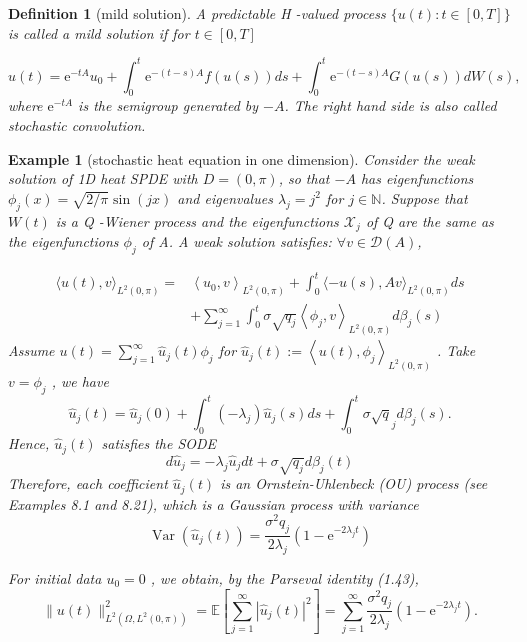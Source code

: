\documentclass{article}
\newtheorem{definition}{Definition}
\newtheorem{example}{Example}
\begin{document}
\begin{definition}[mild solution]
A predictable  H -valued process  $\{u(t): t \in[0, T]\}$  is called a mild solution if for  $t \in[0, T] $

$$u(t)=\mathrm{e}^{-t A} u_{0}+\int_{0}^{t} \mathrm{e}^{-(t-s) A} f(u(s)) d s+\int_{0}^{t} \mathrm{e}^{-(t-s) A} G(u(s)) d W(s),$$
where  $\mathrm{e}^{-t A}$  is the semigroup generated by  $-A$. The right hand side is also called stochastic convolution.
\end{definition}

\begin{example}[stochastic heat equation in one dimension]
    Consider the weak solution of 1D heat SPDE with  $D=(0, \pi)$, so that  $-A$  has eigenfunctions  $\phi_{j}(x)=\sqrt{2 / \pi} \sin (j x)$ 
    and eigenvalues  $\lambda_{j}=j^{2}$  for  $j \in \mathbb{N}$. Suppose that  $W(t)$  is a  Q -Wiener process 
    and the eigenfunctions  $\mathcal{X}_{j}$ of Q are the same as the eigenfunctions  $\phi_{j}$  of  A. A weak solution satisfies: $\forall v \in \mathcal{D}(A)$, 

\begin{equation}
    \begin{aligned}
    \langle u(t), v\rangle_{L^{2}(0, \pi)}= & \left\langle u_{0}, v\right\rangle_{L^{2}(0, \pi)}+\int_{0}^{t}\langle-u(s), A v\rangle_{L^{2}(0, \pi)} d s \\
    & +\sum_{j=1}^{\infty} \int_{0}^{t} \sigma \sqrt{q_{j}}\left\langle\phi_{j}, v\right\rangle_{L^{2}(0, \pi)} d \beta_{j}(s)
    \end{aligned}
\end{equation}
Assume $u(t)=\sum_{j=1}^{\infty} \hat{u}_{j}(t) \phi_{j}$  for  $\hat{u}_{j}(t):=\left\langle u(t), \phi_{j}\right\rangle_{L^{2}(0, \pi)}$ . Take  $v=\phi_{j}$ , we have 
\begin{equation}
    \hat{u}_{j}(t)=\hat{u}_{j}(0)+\int_{0}^{t}\left(-\lambda_{j}\right) \hat{u}_{j}(s) d s+\int_{0}^{t} \sigma \sqrt{q}_{j} d \beta_{j}(s) .
\end{equation}
Hence,  $\hat{u}_{j}(t)$  satisfies the SODE
\begin{equation}
d \hat{u}_{j}=-\lambda_{j} \hat{u}_{j} d t+\sigma \sqrt{q_{j}} d \beta_{j}(t)
\end{equation}
Therefore, each coefficient  $\hat{u}_{j}(t)$  is an Ornstein-Uhlenbeck (OU) process (see Examples 8.1 and 8.21), which is a Gaussian process with variance
\begin{equation}
\operatorname{Var}\left(\hat{u}_{j}(t)\right)=\frac{\sigma^{2} q_{j}}{2 \lambda_{j}}\left(1-\mathrm{e}^{-2 \lambda_{j} t}\right)
\end{equation}

For initial data  $u_{0}=0$ , we obtain, by the Parseval identity (1.43),
\begin{equation}
\|u(t)\|_{L^{2}\left(\Omega, L^{2}(0, \pi)\right)}^{2}=\mathbb{E}\left[\sum_{j=1}^{\infty}\left|\hat{u}_{j}(t)\right|^{2}\right]=\sum_{j=1}^{\infty} \frac{\sigma^{2} q_{j}}{2 \lambda_{j}}\left(1-\mathrm{e}^{-2 \lambda_{j} t}\right) .
\end{equation}
\end{example}
\end{document}
